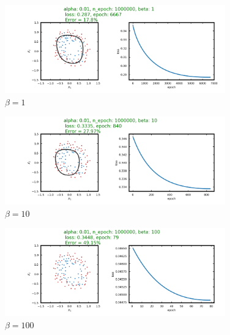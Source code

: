 \begin{figure}[H]
\centering
  \includegraphics[width=0.85\textwidth]{fig/prob3/alpha_0_01_n_epoch1000000_beta_1.png}
\centering 
\caption{\protect $\beta = 1$}
\label{fig:15th}
\end{figure}

\begin{figure}[H]
\centering
  \includegraphics[width=0.85\textwidth]{fig/prob3/alpha_0_01_n_epoch1000000_beta_10.png}
\centering 
\caption{\protect $\beta = 10$}
\label{fig:15th}
\end{figure}

\begin{figure}[H]
\centering
  \includegraphics[width=0.85\textwidth]{fig/prob3/alpha_0_01_n_epoch1000000_beta_100.png}
\centering 
\caption{\protect $\beta = 100$}
\label{fig:15th}
\end{figure}



